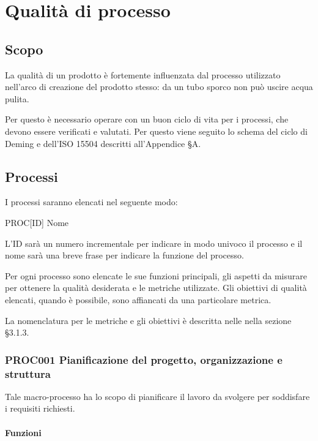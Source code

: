 \section{Qualità di processo}\label{QualitaProcesso}

\subsection{Scopo}
La qualità di un prodotto è fortemente influenzata dal processo utilizzato nell'arco di creazione del prodotto stesso: da un tubo sporco non può uscire acqua pulita.

Per questo è necessario operare con un buon ciclo di vita per i processi, che devono essere verificati e valutati. Per questo viene seguito lo schema del ciclo di Deming e dell'ISO 15504 descritti all'Appendice §A.

\subsection{Processi}
I processi saranno elencati nel seguente modo:

\begin{center}
	PROC[ID] Nome
\end{center}

L'ID sarà un numero incrementale per indicare in modo univoco il processo e il nome sarà una breve frase per indicare la funzione del processo.

Per ogni processo sono elencate le sue funzioni principali, gli aspetti da misurare per ottenere la qualità desiderata e le metriche utilizzate. Gli obiettivi di qualità elencati, quando è possibile, sono affiancati da una particolare metrica. 

La nomenclatura per le metriche e gli obiettivi è descritta nelle \Doc{\NdP} nella sezione §3.1.3.

	\subsubsection{PROC001 Pianificazione del progetto, organizzazione e struttura}
	Tale macro-processo ha lo scopo di pianificare il lavoro da svolgere per soddisfare i requisiti richiesti.
	
		\paragraph*{Funzioni}
	

